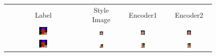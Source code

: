 \addtolength{\tabcolsep}{-4.5pt}    
\bgroup
\def\arraystretch{0.5}%
\begin{figure}[th]
\small
\begin{tabular} {cc|cc}
Label & Style Image & Encoder1 & Encoder2
\\
\includegraphics[width=0.11\textwidth]{Images/Encoder_search/encoder_1.png} & \includegraphics[width=0.11\textwidth]{Images/Encoder_search/style/29659.png} &
\includegraphics[width=0.11\textwidth]{Images/Encoder_search/SEAN_level/1.png} &   \includegraphics[width=0.11\textwidth]{Images/Encoder_search/Unified/1.png}\\ 

\includegraphics[width=0.11\textwidth]{Images/Encoder_search/encoder_1.png} & \includegraphics[width=0.11\textwidth]{Images/Encoder_search/style/29598.png} &
\includegraphics[width=0.11\textwidth]{Images/Encoder_search/SEAN_level/2.png} &   \includegraphics[width=0.11\textwidth]{Images/Encoder_search/Unified/2.png}\\ 


\end{tabular}
\end{figure}
